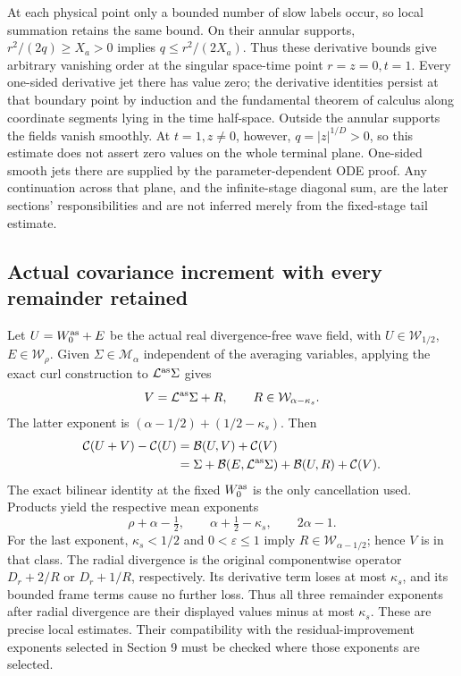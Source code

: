 \documentclass[10pt,a4paper]{article}
\begin{document}
At each physical point only a bounded number of slow labels occur, so local summation retains the same bound. On their annular supports, \(r^2/(2q)\ge X_a>0\) implies \(q\le r^2/(2X_a)\). Thus these derivative bounds give arbitrary vanishing order at the singular space-time point \(r=z=0,t=1\). Every one-sided derivative jet there has value zero; the derivative identities persist at that boundary point by induction and the fundamental theorem of calculus along coordinate segments lying in the time half-space. Outside the annular supports the fields vanish smoothly. At \(t=1,z\ne0\), however, \(q=|z|^{1/D}>0\), so this estimate does not assert zero values on the whole terminal plane. One-sided smooth jets there are supplied by the parameter-dependent ODE proof. Any continuation across that plane, and the infinite-stage diagonal sum, are the later sections' responsibilities and are not inferred merely from the fixed-stage tail estimate.

\subsection{Actual covariance increment with every remainder retained}\label{actual-covariance-increment-with-every-remainder-retained}

Let \(U=W_0^{\rm as}+E\) be the actual real divergence-free wave field, with \(U\in\mathcal W_{1/2}\), \(E\in\mathcal W_\rho\). Given \(\Sigma\in\mathcal M_\alpha\) independent of the averaging variables, applying the exact curl construction to \(\mathcal L^{\rm as}\Sigma\) gives \[
V=\mathcal L^{\rm as}\Sigma+R,\qquad R\in\mathcal W_{\alpha-\kappa_s}.
\] The latter exponent is \((\alpha-1/2)+(1/2-\kappa_s)\). Then \[
\begin{aligned}
\mathcal C(U+V)-\mathcal C(U)
&=\mathcal B(U,V)+\mathcal C(V)\\
&=\Sigma+\mathcal B(E,\mathcal L^{\rm as}\Sigma)
+\mathcal B(U,R)+\mathcal C(V).
\end{aligned}
\] The exact bilinear identity at the fixed \(W_0^{\rm as}\) is the only cancellation used. Products yield the respective mean exponents \[
\rho+\alpha-\tfrac12,\qquad
\alpha+\tfrac12-\kappa_s,\qquad
2\alpha-1.
\] For the last exponent, \(\kappa_s<1/2\) and \(0<\varepsilon\le1\) imply \(R\in\mathcal W_{\alpha-1/2}\); hence \(V\) is in that class. The radial divergence is the original componentwise operator \(D_r+2/R\) or \(D_r+1/R\), respectively. Its derivative term loses at most \(\kappa_s\), and its bounded frame terms cause no further loss. Thus all three remainder exponents after radial divergence are their displayed values minus at most \(\kappa_s\). These are precise local estimates. Their compatibility with the residual-improvement exponents selected in Section 9 must be checked where those exponents are selected.
\end{document}
